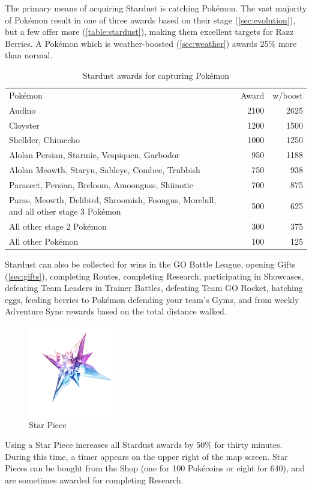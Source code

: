 The primary means of acquiring Stardust is catching Pokémon.
The vast majority of Pokémon result in one of three awards based on their stage
 (\autoref{sec:evolution}), but a few offer more (\autoref{table:stardust}),
 making them excellent targets for Razz Berries.
A Pokémon which is weather-boosted (\autoref{sec:weather}) awards 25\% more than normal.
\begin{table}[ht]
  \begin{centering}
    \begin{tabular}{p{}rr}
      Pokémon & Award & w/boost\\
      \Midrule
      Audino & 2100 & 2625\\
      Cloyster & 1200 & 1500\\
      Shellder, Chimecho & 1000 & 1250\\
      Alolan Persian, Starmie, Vespiquen, Garbodor & 950 & 1188\\
      Alolan Meowth, Staryu, Sableye, Combee, Trubbish & 750 & 938\\
      Parasect, Persian, Breloom, Amoonguss, Shiinotic & 700 & 875\\
      Paras, Meowth, Delibird, Shroomish, Foongus,\newline
      \hspace{\parindent}Morelull, and all other stage 3 Pokémon & 500 & 625\\
      All other stage 2 Pokémon & 300 & 375\\
      All other Pokémon & 100 & 125\\
    \end{tabular}
  \end{centering}
  \caption{Stardust awards for capturing Pokémon}
  \label{table:stardust}
\end{table}
Stardust can also be collected for wins in the GO Battle League,
  opening Gifts (\autoref{sec:gifts}),
  completing Routes,
  completing Research,
  participating in Showcases,
  defeating Team Leaders in Trainer Battles,
  defeating Team GO Rocket,
  hatching eggs,
  feeding berries to Pokémon defending your team's Gyms,
  and from weekly Adventure Sync rewards based on the total distance walked.

\begin{figure}
  \center
  \includegraphics[scale=.5]{images/starpiece.png}
  \caption{Star Piece}
\end{figure}
Using a Star Piece increases all Stardust awards by 50\% for thirty minutes.
During this time, a timer appears on the upper right of the map screen.
Star Pieces can be bought from the Shop (one for 100 Pokécoins or eight for 640),
  and are sometimes awarded for completing Research.

